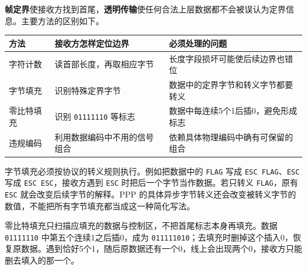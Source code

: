 \begin{definition}[帧边界与透明传输]

\textbf{帧定界}使接收方找到首尾，\textbf{透明传输}使任何合法上层数据都不会被误认为定界信息。主要方法的区别如下。

\end{definition}

\begin{wideblock}

\par\medskip\noindent\begin{minipage}{\linewidth}\fontsize{9.3}{12}\selectfont\begin{tabularx}{\linewidth}{@{}YYY@{}}
\toprule\noalign{}
\begin{minipage}[b]{\linewidth}\raggedright
方法
\end{minipage} & \begin{minipage}[b]{\linewidth}\raggedright
接收方怎样定位边界
\end{minipage} & \begin{minipage}[b]{\linewidth}\raggedright
必须处理的问题
\end{minipage} \\
\midrule\noalign{}


字符计数 & 读首部长度，再取相应字节 & 长度字段损坏可能使后续边界也错位 \\
字节填充 & 识别特殊定界字节 & 数据中的定界字节和转义字节都要转义 \\
零比特填充 & 识别 \texttt{01111110} 等标志 & 数据中每连续5个1后插0，避免形成标志 \\
违规编码 & 利用数据编码中不用的信号组合 & 依赖具体物理编码中确有可保留的组合 \\
\bottomrule\end{tabularx}
\end{minipage}\par\medskip

\end{wideblock}

字节填充必须按协议的转义规则执行。例如把数据中的 \texttt{FLAG} 写成 \texttt{ESC FLAG}、\texttt{ESC} 写成 \texttt{ESC ESC}，接收方遇到 \texttt{ESC} 时把后一个字节当作数据。若只转义 \texttt{FLAG}，原有 \texttt{ESC} 就会改变后续字节的解释。PPP 的具体异步字节转义还会改变被转义字节的数值，不能把所有字节填充都当成这一种简化写法。

零比特填充只扫描应填充的数据与控制区，不把首尾标志本身再填充。数据 \texttt{01111110} 中第五个连续1之后插0，成为 \texttt{011111010}；去填充时删掉这个插入0，恢复原数据。遇到恰好5个1，随后原数据还有一个0，线上会出现两个0，接收方只能删去填入的那一个。

